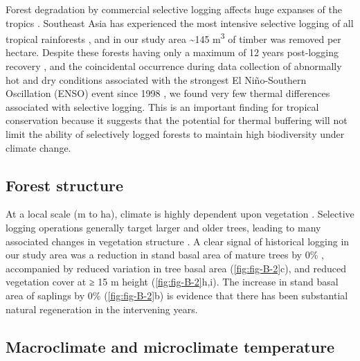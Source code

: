 \documentclass[12pt,a4paper,]{report}
\theoremstyle{definition}
\theoremstyle{definition}
\theoremstyle{definition}
\theoremstyle{remark}
\begin{document}
Forest degradation by commercial selective logging affects huge expanses
of the tropics \citep{asner_contemporary_2009, lewis_increasing_2015}.
Southeast Asia has experienced the most intensive selective logging of
all tropical rainforests \citep{lewis_increasing_2015}, and in our study
area \textasciitilde{}145 m\textsuperscript{3} of timber was removed per
hectare. Despite these forests having only a maximum of 12 years
post-logging recovery \citep{fisher_cost-effective_2011}, and the
coincidental occurrence during data collection of abnormally hot and dry
conditions associated with the strongest El Niño-Southern Oscillation
(ENSO) event since 1998 \citep{noaa_2015}, we found very few thermal
differences associated with selective logging. This is an important
finding for tropical conservation because it suggests that the potential
for thermal buffering will not limit the ability of selectively logged
forests to maintain high biodiversity under climate change.

\subsection{Forest structure}\label{forest-structure-2}

At a local scale (m to ha), climate is highly dependent upon vegetation
\citep{oke_boundary_1987, sears_world_2011}. Selective logging
operations generally target larger and older trees, leading to many
associated changes in vegetation structure
\citep{okuda_effect_2003, kumar_effects_2005, edwards_maintaining_2014}.
A clear signal of historical logging in our study area was a reduction
in stand basal area of mature trees by 0\%
\citep[\autoref{fig:fig-B-2}a;][]{berry_impacts_2008}, accompanied by
reduced variation in tree basal area (\autoref{fig:fig-B-2}c), and
reduced vegetation cover at ≥ 15 m height (\autoref{fig:fig-B-2}h,i).
The increase in stand basal area of saplings by 0\%
(\autoref{fig:fig-B-2}b) is evidence that there has been substantial
natural regeneration in the intervening years.

\subsection{Macroclimate and microclimate
temperature}\label{macroclimate-and-microclimate-temperature-1}
\end{document}
